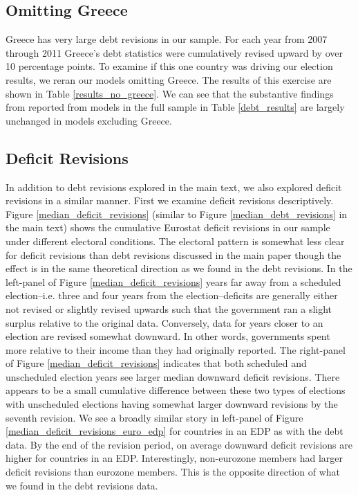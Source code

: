 \documentclass[]{article}
\begin{document}


\subsection*{Omitting Greece}

Greece has very large debt revisions in our sample. For each year from 2007 through 2011 Greece's debt statistics were cumulatively revised upward by over 10 percentage points. To examine if this one country was driving our election results, we reran our models omitting Greece. The results of this exercise are shown in Table \ref{results_no_greece}. We can see that the substantive findings from reported from models in the full sample in Table \ref{debt_results} are largely unchanged in models excluding Greece.

\begin{landscape}
    
\end{landscape}

\subsection*{Deficit Revisions}

In addition to debt revisions explored in the main text, we also explored deficit revisions in a similar manner. First we examine deficit revisions descriptively. Figure \ref{median_deficit_revisions} (similar to Figure \ref{median_debt_revisions} in the main text) shows the cumulative Eurostat deficit revisions in our sample under different electoral conditions. The electoral pattern is somewhat less clear for deficit revisions than debt revisions discussed in the main paper though the effect is in the same theoretical direction as we found in the debt revisions. In the left-panel of Figure \ref{median_deficit_revisions} years far away from a scheduled election--i.e. three and four years from the election--deficits are generally either not revised or slightly revised upwards such that the government ran a slight surplus relative to the original data. Conversely, data for years closer to an election are revised somewhat downward. In other words, governments spent more relative to their income than they had originally reported. The right-panel of Figure \ref{median_deficit_revisions} indicates that both scheduled and unscheduled election years see larger median downward deficit revisions. There appears to be a small cumulative difference between these two types of elections with unscheduled elections having somewhat larger downward revisions by the seventh revision. We see a broadly similar story in left-panel of Figure \ref{median_deficit_revisions_euro_edp} for countries in an EDP as with the debt data. By the end of the revision period, on average downward deficit revisions are higher for countries in an EDP. Interestingly, non-eurozone members had larger deficit revisions than eurozone members. This is the opposite direction of what we found in the debt revisions data.
\end{document}
